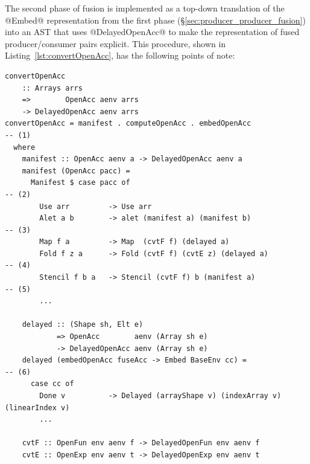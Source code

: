 The second phase of fusion is implemented as a top-down translation of the
@Embed@ representation from the first phase
(\S\ref{sec:producer_producer_fusion}) into an AST that uses @DelayedOpenAcc@ to
make the representation of fused producer/consumer pairs explicit. This
procedure, shown in Listing~\ref{lst:convertOpenAcc}, has the following points
of note:

\begin{lstlisting}[style=haskell_float,
    label=lst:convertOpenAcc,
    caption={Consumer fusion via top-down annotation of the AST}]
convertOpenAcc
    :: Arrays arrs
    =>        OpenAcc aenv arrs
    -> DelayedOpenAcc aenv arrs
convertOpenAcc = manifest . computeOpenAcc . embedOpenAcc                              -- (1)
  where
    manifest :: OpenAcc aenv a -> DelayedOpenAcc aenv a
    manifest (OpenAcc pacc) =
      Manifest $ case pacc of                                                          -- (2)
        Use arr         -> Use arr
        Alet a b        -> alet (manifest a) (manifest b)                              -- (3)
        Map f a         -> Map  (cvtF f) (delayed a)
        Fold f z a      -> Fold (cvtF f) (cvtE z) (delayed a)                          -- (4)
        Stencil f b a   -> Stencil (cvtF f) b (manifest a)                             -- (5)
        ...

    delayed :: (Shape sh, Elt e)
            => OpenAcc        aenv (Array sh e)
            -> DelayedOpenAcc aenv (Array sh e)
    delayed (embedOpenAcc fuseAcc -> Embed BaseEnv cc) =                               -- (6)
      case cc of
        Done v          -> Delayed (arrayShape v) (indexArray v) (linearIndex v)
        ...

    cvtF :: OpenFun env aenv f -> DelayedOpenFun env aenv f
    cvtE :: OpenExp env aenv t -> DelayedOpenExp env aenv t
\end{lstlisting}


